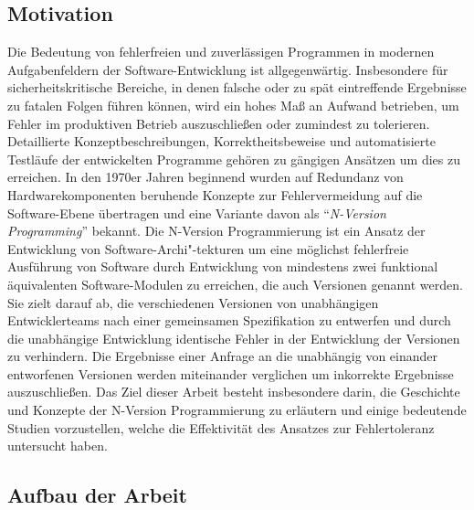 \subsection{Motivation}\label{motivation}

Die Bedeutung von fehlerfreien und zuverlässigen Programmen in modernen Aufgabenfeldern der Software-Entwicklung ist allgegenwärtig.
Insbesondere für sicherheitskritische Bereiche, in denen falsche oder zu spät eintreffende Ergebnisse zu fatalen Folgen führen können, wird ein hohes Maß an Aufwand betrieben, um Fehler im produktiven Betrieb auszuschließen oder zumindest zu tolerieren.
Detaillierte Konzeptbeschreibungen, Korrektheitsbeweise und automatisierte Testläufe der entwickelten Programme gehören zu gängigen Ansätzen um dies zu erreichen.
In den 1970er Jahren beginnend wurden auf Redundanz von Hardwarekomponenten beruhende Konzepte zur Fehlervermeidung auf die Software-Ebene übertragen und eine Variante davon als \enquote{\emph{N-Version Programming}} \cite{Chen1978} bekannt.
Die N-Version Programmierung ist ein Ansatz der Entwicklung von Software-Archi"-tekturen um eine möglichst fehlerfreie Ausführung von Software durch Entwicklung von mindestens zwei funktional äquivalenten Software-Modulen zu erreichen, die auch Versionen genannt werden.
Sie zielt darauf ab, die verschiedenen Versionen von unabhängigen Entwicklerteams nach einer gemeinsamen Spezifikation zu entwerfen und durch die unabhängige Entwicklung identische Fehler in der Entwicklung der Versionen zu verhindern.
Die Ergebnisse einer Anfrage an die unabhängig von einander entworfenen Versionen werden miteinander verglichen um inkorrekte Ergebnisse auszuschließen.
Das Ziel dieser Arbeit besteht insbesondere darin, die Geschichte und Konzepte der N-Version Programmierung zu erläutern und einige bedeutende Studien vorzustellen, welche die Effektivität des Ansatzes zur Fehlertoleranz untersucht haben.


\subsection{Aufbau der Arbeit}\label{aufbau}

